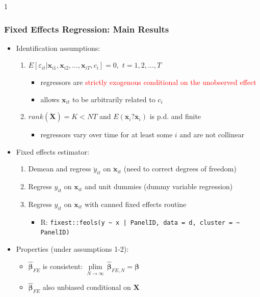 \documentclass[xcolor=svgnames,9pt,english, aspectratio=169]{beamer}
\newcommand{\red}{\textcolor{red}}
\newcommand{\solutions}{0}
\newcommand{\bs}{\boldsymbol}
\newcommand{\mb}{\mathbf}
\newcommand{\X}{\ensuremath{\mb{X}}}
\newcommand{\x}{\ensuremath{\mb{x}}}
\renewcommand{\b}{\ensuremath{\bs{\beta}}}
\newcommand{\bhat}{\ensuremath{\hat{\bs{\beta}}}}
\begin{document}
\if\solutions1
\begin{frame}
  \frametitle{Fixed Effects Regression: Main Results}
  \small
\begin{itemize}
  \item Identification assumptions:
  \begin{enumerate}
    \item $E[\varepsilon_{it}|\x_{i1},\x_{i2},...,\x_{iT},c_i]=0, \,\,t=1,2,...,T$
    \begin{itemize}
    \item regressors are \red{strictly exogenous conditional on the unobserved effect}
      \item allows $\x_{it}$ to be arbitrarily related to $c_i$
    \end{itemize}
    \item  $rank(\ddot{\X}) = K < NT$ and $E(\ddot{\x_i}?\ddot{\x_i})$ is p.d. and finite
           \begin{itemize}
      \item regressors vary over time for at least some $i$ and are not collinear
    \end{itemize}
  \end{enumerate}\pause
  \item Fixed effects estimator:
  \begin{enumerate}
    \item Demean and regress $\ddot{y}_{it}$ on $\ddot{\x}_{it}$ (need to correct degrees of freedom)
    \item Regress $y_{it}$ on $\x_{it}$ and unit dummies (dummy variable regression)
    \item Regress $y_{it}$ on $\x_{it}$ with canned fixed effects routine
    \begin{itemize}
      \item R: \texttt{fixest::feols(y \textasciitilde{} x | PanelID, data = d, cluster = \textasciitilde{} PanelID)}
    \end{itemize}
  \end{enumerate}\pause
   \item Properties (under assumptions 1-2):
  \begin{itemize}
    \item $\bhat_{FE}$ is consistent: $\underset{N\to\infty}{\operatorname{plim}}\,\bhat_{FE,N}  = \b$
    \item $\bhat_{FE}$ also unbiased conditional on $\X$
  \end{itemize}
\end{itemize}
\end{frame}
\fi
\end{document}
